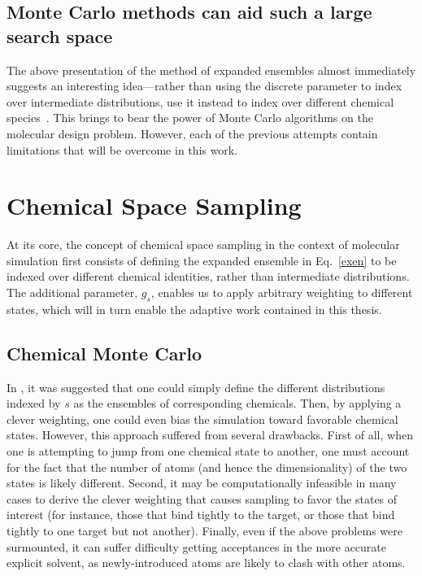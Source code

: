 \subsection{Monte Carlo methods can aid such a large search space}
%
The above presentation of the method of expanded ensembles almost immediately suggests an interesting idea---rather than using the discrete parameter to index over intermediate distributions, use it instead to index over different chemical species~\cite{Pitera1998}.
%
This brings to bear the power of Monte Carlo algorithms on the molecular design problem.
%
However, each of the previous attempts contain limitations that will be overcome in this work.
%
\section{Chemical Space Sampling}
%
At its core, the concept of chemical space sampling in the context of molecular simulation first consists of defining the expanded ensemble in Eq.~\ref{exen} to be indexed over different chemical identities, rather than intermediate distributions.
%
The additional parameter, $g_s$, enables us to apply arbitrary weighting to different states, which will in turn enable the adaptive work contained in this thesis. 
%
\subsection{Chemical Monte Carlo}
%
In \cite{Pitera1998}, it was suggested that one could simply define the different distributions indexed by $s$ as the ensembles of corresponding chemicals.
%
Then, by applying a clever weighting, one could even bias the simulation toward favorable chemical states.
%
However, this approach suffered from several drawbacks.
%
First of all, when one is attempting to jump from one chemical state to another, one must account for the fact that the number of atoms (and hence the dimensionality) of the two states is likely different.
%
Second, it may be computationally infeasible in many cases to derive the clever weighting that causes sampling to favor the states of interest (for instance, those that bind tightly to the target, or those that bind tightly to one target but not another).
%
Finally, even if the above problems were surmounted, it can suffer difficulty getting acceptances in the more accurate explicit solvent, as newly-introduced atoms are likely to clash with other atoms.
%
